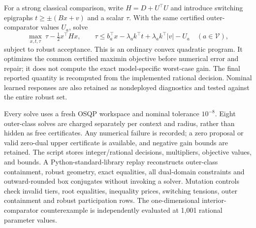 \documentclass[11pt,letterpaper]{article}
\theoremstyle{definition}
\newcommand{\1}{\mathbf 1}
\begin{document}
For a strong classical comparison, write $H=D+U^\top U$ and introduce switching epigraphs $t\geq\pm(Bx+v)$ and a scalar $\tau$. With the same certified outer-comparator values $U_a$, solve
\[
 \max_{x,t,\tau}\ \tau-\tfrac12x^\top Hx,\qquad
 \tau\leq b_a^\top x-\lambda_a k^\top t
       +\lambda_a k^\top|v|-U_a\quad(a\in\mathcal V),
\]
subject to robust acceptance. This is an ordinary convex quadratic program. It optimizes the common certified maximin objective before numerical error and repair; it does not compute the exact model-specific worst-case gain. The final reported quantity is recomputed from the implemented rational decision. Nominal learned responses are also retained as nondeployed diagnostics and tested against the entire robust set.

Every solve uses a fresh OSQP workspace and nominal tolerance $10^{-8}$. Eight outer-class solves are charged separately per context and radius, rather than hidden as free certificates. Any numerical failure is recorded; a zero proposal or valid zero-dual upper certificate is available, and negative gain bounds are retained. The script stores integer/rational decisions, multipliers, objective values, and bounds. A Python-standard-library replay reconstructs outer-class containment, robust geometry, exact equalities, all dual-domain constraints and outward-rounded box conjugates without invoking a solver. Mutation controls check invalid tiers, root equalities, inequality prices, switching tensions, outer containment and robust participation rows. The one-dimensional interior-comparator counterexample is independently evaluated at 1,001 rational parameter values.
\end{document}
